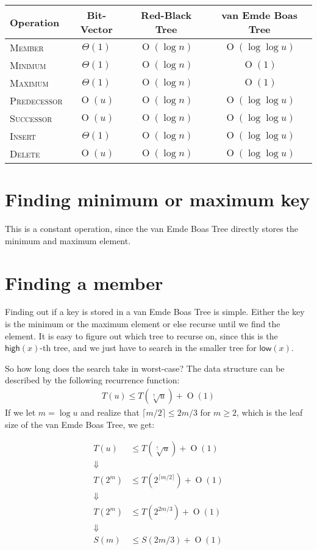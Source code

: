 \documentclass[oneside,11pt,openright]{report}
\newcommand{\BigO}[1]{\ensuremath{\operatorname{O}\left(#1\right)}}
\newcommand{\BigT}[1]{\ensuremath{\Theta\left(#1\right)}}
\newcommand{\Insert}{\textsc{Insert}}
\newcommand{\Delete}{\textsc{Delete}}
\newcommand{\Member}{\textsc{Member}}
\newcommand{\Minimum}{\textsc{Minimum}}
\newcommand{\Maximum}{\textsc{Maximum}}
\newcommand{\Predecessor}{\textsc{Predecessor}}
\newcommand{\Successor}{\textsc{Successor}}
\newcommand{\HIGH}{\textsf{high}}
\newcommand{\LOW}{\textsf{low}}
\newcommand{\HIGHER}{\sqrt[\uparrow]{u}}
\begin{document}
\begin{center}
  \begin{tabular}{ l | c | c | c }
    Operation & Bit-Vector & Red-Black Tree & van Emde Boas Tree \\ \hline
    \Member & $\BigT{1}$ & $\BigO{\log n}$ & $\BigO{\log \log u}$ \\ 
    \Minimum & $\BigT{1}$ & $\BigO{\log n}$ & $\BigO{1}$\\ 
    \Maximum & $\BigT{1}$ & $\BigO{\log n}$ & $\BigO{1}$ \\ 
    \Predecessor & $\BigO{u}$ & $\BigO{\log n}$ & $\BigO{\log \log u}$  \\ 
    \Successor & $\BigO{u}$ & $\BigO{\log n}$ & $\BigO{\log \log u}$ \\ 
    \Insert & $\BigT{1}$ & $\BigO{\log n}$ & $\BigO{\log \log u}$ \\ 
    \Delete & $\BigO{u}$ & $\BigO{\log n}$ & $\BigO{\log \log u}$ \\
  \end{tabular}
\end{center}

\section{Finding minimum or maximum key}

This is a constant operation, since the van Emde Boas Tree directly stores the minimum and maximum element.

\section{Finding a member}

Finding out if a key is stored in a van Emde Boas Tree is simple. Either the key is the minimum or the maximum element or else recurse until we find the element. It is easy to figure out which tree to recurse on, since this is the $\HIGH(x)$-th tree, and we just have to search in the smaller tree for $\LOW(x)$.

So how long does the search take in worst-case? The data structure can be described by the following recurrence function: 
\begin{align*}
    T(u) \leq T(\HIGHER) + \BigO{1}
\end{align*}
If we let $m = \log u$ and realize that $\lceil{m/2}\rceil \leq 2m/3$ for $m \geq 2$, which is the leaf size of the van Emde Boas Tree, we get:

\begin{align*}
    T(u)  & \leq T(\HIGHER) + \BigO{1} \\
    \Downarrow \\
    T(2^m) & \leq T(2^{\lceil{m/2}\rceil}) + \BigO{1} \\
    \Downarrow \\
    T(2^m) & \leq T(2^{2m/3}) + \BigO{1} \\
    \Downarrow \\
    S(m) & \leq S(2m/3) + \BigO{1} \\
\end{align*}
\end{document}
